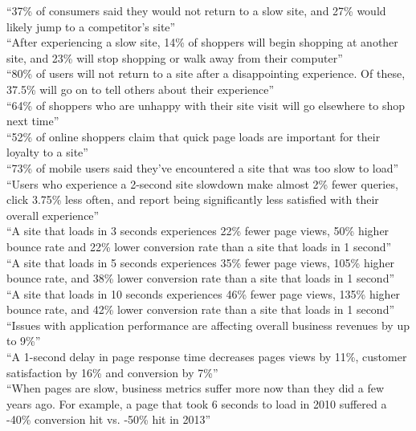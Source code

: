 	“37\% of consumers said they would not return to a slow site, and 27\% would likely jump to a competitor’s site”\\

	“After experiencing a slow site, 14\% of shoppers will begin shopping at another site, and 23\% will stop shopping or walk away from their computer”\\

	“80\% of users will not return to a site after a disappointing experience. Of these, 37.5\% will go on to tell others about their experience”\\

	“64\% of shoppers who are unhappy with their site visit will go elsewhere to shop next time”\\

	“52\% of online shoppers claim that quick page loads are important for their loyalty to a site”\\

	“73\% of mobile users said they’ve encountered a site that was too slow to load”\\

	“Users who experience a 2-second site slowdown make almost 2\% fewer queries, click 3.75\% less often, and report being significantly less satisfied with their overall experience”\\

	“A site that loads in 3 seconds experiences 22\% fewer page views, 50\% higher bounce rate and 22\% lower conversion rate than a site that loads in 1 second”\\

	“A site that loads in 5 seconds experiences 35\% fewer page views, 105\% higher bounce rate, and 38\% lower conversion rate than a site that loads in 1 second”\\

	“A site that loads in 10 seconds experiences 46\% fewer page views, 135\% higher bounce rate, and 42\% lower conversion rate than a site that loads in 1 second”\\

	“Issues with application performance are affecting overall business revenues by up to 9\%”\\

	“A 1-second delay in page response time decreases pages views by 11\%, customer satisfaction by 16\% and conversion by 7\%”\\

	“When pages are slow, business metrics suffer more now than they did a few years ago. For example, a page that took 6 seconds to load in 2010 suffered a -40\% conversion hit vs. -50\% hit in 2013”\\

